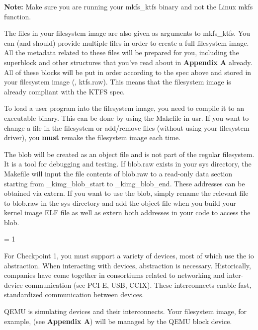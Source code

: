 \documentclass{article}
\begin{document}
\textbf{Note:} Make sure you are running your {\fix mkfs\_ktfs} binary and not the Linux {\fix mkfs} function.

The files in your filesystem image are also given as arguments to {\fix mkfs\_ktfs}. You can (and
should) provide multiple files in order to create a full filesystem image. All the metadata related 
to these files will be prepared for you, including the superblock and other structures that you've
read about in \textbf{Appendix A} already. All of these blocks will be put in order according to the 
spec above and stored in your filesystem image (\ie, {\fix ktfs.raw}). This means that the filesystem 
image is already compliant with the KTFS spec.

To load a user program into the filesystem image, you need to compile it to an executable
binary. This can be done by using the {\fix Makefile} in {\fix usr}. If you want to change
a file in the filesystem or add/remove files (without using your filesystem driver), 
you \textbf{must} remake the filesystem image each time.

The blob will be created as an object file and is not part of the regular filesystem. 
It is a tool for debugging and testing. If {\fix blob.raw} exists in your {\fix sys} directory,
the {\fix Makefile} 
will input the file contents of {\fix blob.raw} to a read-only data section starting from 
{\fix \_kimg\_blob\_start} to {\fix \_kimg\_blob\_end}. These addresses can be obtained via {\fix extern}. 
If you want to use the blob, simply rename the relevant file to {\fix blob.raw} in the {\fix sys} 
directory and add the object file when you build your kernel image ELF file as well as {\fix extern} both 
addresses in your code to access the blob.
\vfill



\else
\fi

\ifnum\renderappB = 1

\pagebreak
{}


For Checkpoint 1, you must support a variety of devices, most of which use the {\fix io} abstraction. When interacting with devices, abstraction is necessary. Historically, companies have come together in consortiums related to networking and inter-device communication (see PCI-E, USB, CCIX). These interconnects enable fast, standardized communication between devices.

QEMU is simulating devices and their interconnects. Your filesystem image, for example, (see \textbf{Appendix A}) will be managed by the QEMU block device.
\end{document}
